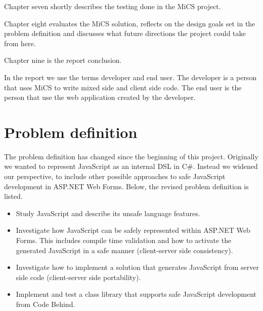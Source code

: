 	Chapter seven shortly describes the testing done in the MiCS project.
	
	Chapter eight evaluates the MiCS solution, reflects on the design goals set in the problem definition and discusses what future directions the project could take from here.

	Chapter nine is the report conclusion.

	In the report we use the terms developer and end user. The developer is a person that uses MiCS to write mixed side and client side code. The end user is the person that use the web application created by the developer.


\section{Problem definition}
	The problem definition has changed since the beginning of this project. Originally we wanted to represent JavaScript as an internal DSL in C\#. Instead we widened our perspective, to include other possible approaches to safe JavaScript development in ASP.NET Web Forms. Below, the revised problem definition is listed.
	\begin{itemize}

	\item Study JavaScript and describe its unsafe language features.

	\item Investigate how JavaScript can be safely represented within ASP.NET Web Forms. This includes compile time validation and how to activate the generated JavaScript in a safe manner (client-server side consistency).

	\item Investigate how to implement a solution that generates JavaScript from server side code (client-server side portability).

	\item Implement and test a class library that supports safe JavaScript development from Code Behind.


	\end{itemize}

